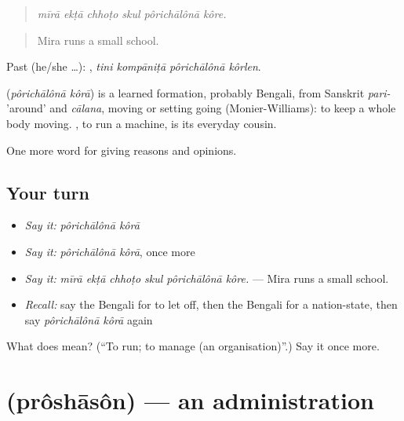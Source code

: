 \begin{quote}
\emph{mīrā ekṭā chhoṭo skul pôrichālônā kôre.}
\end{quote}

\begin{quote}
Mira runs a small school.
\end{quote}

Past (he/she …):    , \emph{tini kompāniṭā pôrichālônā kôrlen}.

\begin{cousinweb}
\textbf{ } (\emph{pôrichālônā kôrā}) is a learned formation, probably Bengali, from Sanskrit \emph{pari-} 'around' and \emph{cālana}, moving or setting going (Monier-Williams): to keep a whole body moving. , to run a machine, is its everyday cousin.
\end{cousinweb}

\begin{grammarlens}[title={What you've built}]
One more word for giving reasons and opinions.
\end{grammarlens}

\subsection*{Your turn}
\begin{itemize}
\raggedright
  \item \emph{Say it:} \emph{pôrichālônā kôrā}
  \item \emph{Say it:} \emph{pôrichālônā kôrā}, once more
  \item \emph{Say it:} \emph{mīrā ekṭā chhoṭo skul pôrichālônā kôre.} — Mira runs a small school.
  \item \emph{Recall:} say the Bengali for to let off, then the Bengali for a nation-state, then say \emph{pôrichālônā kôrā} again
\end{itemize}

\begin{tcolorbox}[breakable,colback=teal!4,colframe=teal!35!black,title={Before you move on}]
What does   mean? (\textquotedblleft{}To run; to manage (an organisation)\textquotedblright{}.) Say it once more.
\end{tcolorbox}
\section[\texorpdfstring{\bn{প্রশাসন} (prôshāsôn)}{প্রশাসন (prôshāsôn)}]{ (prôshāsôn) — an administration}


